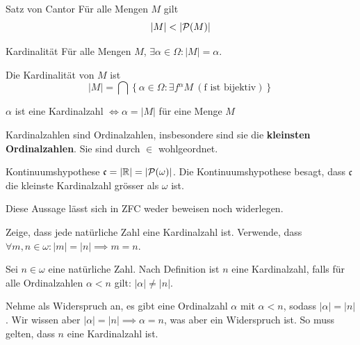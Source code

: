 \documentclass[12pt]{article}
\begin{document}
\begin{theorem}{Satz von Cantor}{}
    Für alle Mengen $M$ gilt
    $$
        |M| < |\mathcal{P}(M)|
    $$
\end{theorem}

\begin{definition}{Kardinalität}{}
    Für alle Mengen $M$, $\exists \alpha \in \Omega : |M| = \alpha$. 
    
    Die Kardinalität von $M$ ist
    $$
        |M| = \bigcap \left\{\alpha \in \Omega : \exists f {}^\alpha M \ (\text{f ist bijektiv})\right\}
    $$

    $\alpha$ ist eine Kardinalzahl $\iff \alpha = |M|$ für eine Menge $M$
\end{definition}

\begin{remark}{}{}
    Kardinalzahlen sind Ordinalzahlen, insbesondere sind sie die \textbf{kleinsten Ordinalzahlen}. Sie sind durch $\in$ wohlgeordnet.
\end{remark}

\begin{definition}{Kontinuumshypothese}{}
    $\mathfrak{c} = |\mathbb{R}| = |\mathcal{P}(\omega)|$. Die Kontinuumshypothese besagt, dass $\mathfrak{c}$ die kleinste Kardinalzahl grösser als $\omega$ ist.

    Diese Aussage lässt sich in ZFC weder beweisen noch widerlegen.
\end{definition}

\begin{exercise}{}{}
    Zeige, dass jede natürliche Zahl eine Kardinalzahl ist. Verwende, dass $\forall m, n \in \omega : |m| = |n| \implies m = n$.
\end{exercise}

\begin{proofbox}
    Sei $n \in \omega$ eine natürliche Zahl. Nach Definition ist $n$ eine Kardinalzahl, falls für alle Ordinalzahlen $\alpha < n$ gilt: $|\alpha| \neq |n|$.

    Nehme als Widerspruch an, es gibt eine Ordinalzahl $\alpha$ mit $\alpha < n$, sodass $|\alpha| = |n|$. Wir wissen aber $|\alpha| = |n| \implies \alpha = n$, was aber ein Widerspruch ist. So muss gelten, dass $n$ eine Kardinalzahl ist.
\end{proofbox}
\end{document}
